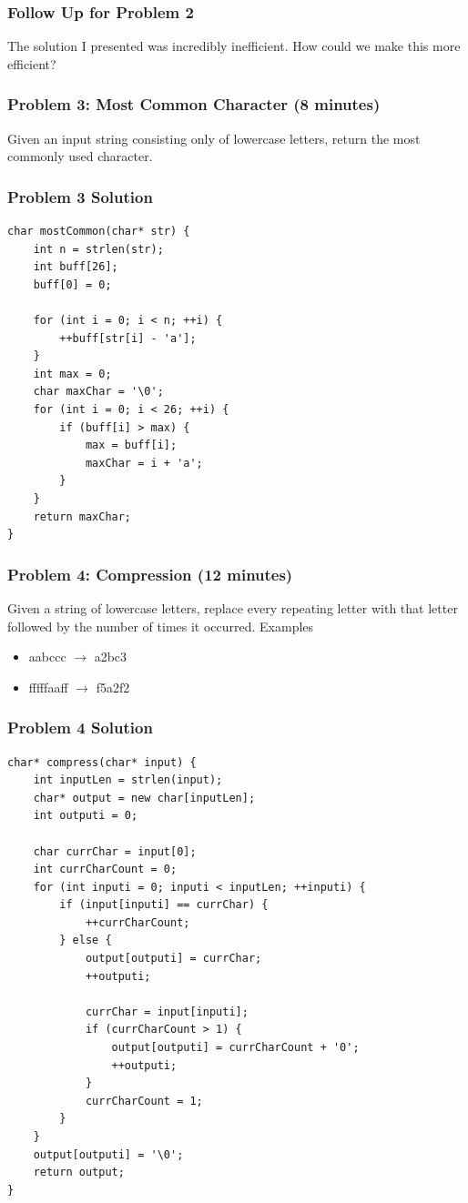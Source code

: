 \documentclass[aspectratio=169]{beamer}
\begin{document}
\begin{frame}
    \frametitle{Follow Up for Problem 2}

    The solution I presented was incredibly inefficient.
    \vfill{}
    How could we make this more efficient?
\end{frame}
\begin{frame}
    \frametitle{Problem 3: Most Common Character (8 minutes)}

    Given an input string consisting only of lowercase letters,
    return the most commonly used character.

\end{frame}
\begin{frame}[fragile]
    \frametitle{Problem 3 Solution}
    \begin{lstlisting}[basicstyle=\tiny]
char mostCommon(char* str) {
    int n = strlen(str);
    int buff[26];
    buff[0] = 0;

    for (int i = 0; i < n; ++i) {
        ++buff[str[i] - 'a'];
    }
    int max = 0;
    char maxChar = '\0';
    for (int i = 0; i < 26; ++i) {
        if (buff[i] > max) {
            max = buff[i];
            maxChar = i + 'a';
        }
    }
    return maxChar;
} 
    \end{lstlisting}

\end{frame}
\begin{frame}
    \frametitle{Problem 4: Compression (12 minutes)}
    
    Given a string of lowercase letters, replace every repeating letter
    with that letter followed by the number of times it occurred.
    \vfill{}
    Examples
    \begin{itemize}
        \item aabccc $\rightarrow$ a2bc3
        \item fffffaaff $\rightarrow$ f5a2f2
    \end{itemize}

\end{frame}
\begin{frame}[fragile]
    \frametitle{Problem 4 Solution}
    \begin{lstlisting}[basicstyle=\tiny]
char* compress(char* input) {
    int inputLen = strlen(input);
    char* output = new char[inputLen];
    int outputi = 0;

    char currChar = input[0];
    int currCharCount = 0;
    for (int inputi = 0; inputi < inputLen; ++inputi) {
        if (input[inputi] == currChar) {
            ++currCharCount;
        } else {
            output[outputi] = currChar;
            ++outputi;

            currChar = input[inputi];
            if (currCharCount > 1) {
                output[outputi] = currCharCount + '0';
                ++outputi;
            }
            currCharCount = 1;
        }
    }
    output[outputi] = '\0';
    return output;
}
    \end{lstlisting}
\end{frame}
\end{document}
